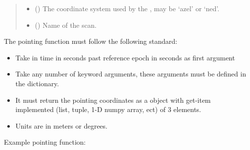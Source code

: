 \documentclass[letterpaper,10pt,english]{sphinxmanual}
\begin{document}
\begin{fulllineitems}
\begin{quote}
\begin{description}
\begin{itemize}
\item {} 
 () \textendash{} The coordinate system used by the , may be ‘azel’ or ‘ned’.

\item {} 
 () \textendash{} Name of the scan.

\end{itemize}

\end{description}\end{quote}


The pointing function must follow the following standard:
\begin{itemize}
\item {} 
Take in time in seconds past reference epoch in seconds as first argument

\item {} 
Take any number of keyword arguments, these arguments must be defined in the  dictionary.

\item {} 
It must return the pointing coordinates as a object with get-item implemented (list, tuple, 1-D numpy array, ect) of 3 elements.

\item {} 
Units are in meters or degrees.

\end{itemize}

Example pointing function:

%
\begin{sphinxVerbatim}[commandchars=\\\{\}]
   


\end{sphinxVerbatim}
\end{fulllineitems}
\end{document}
